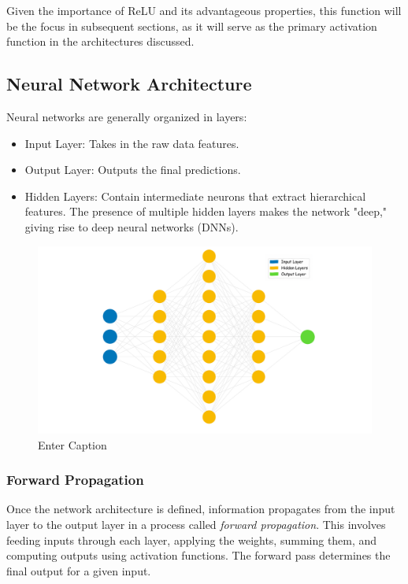 Given the importance of ReLU and its advantageous properties, this function will be the focus in subsequent sections, as it will serve as the primary activation function in the architectures discussed.

\subsection{Neural Network Architecture}
Neural networks are generally organized in layers:
\begin{itemize}
    \item Input Layer: Takes in the raw data features.
    \item Output Layer: Outputs the final predictions.
    \item Hidden Layers: Contain intermediate neurons that extract hierarchical features. The presence of multiple hidden layers makes the network "deep," giving rise to deep neural networks (DNNs).
\end{itemize}

\begin{figure}
    \centering
    \includegraphics[width=0.9\linewidth]{LateX//figs/nn_intro_def.pdf}
    \caption{Enter Caption}
    \label{fig:enter-label}
\end{figure}

\subsubsection*{Forward Propagation}
Once the network architecture is defined, information propagates from the input layer to the output layer in a process called \textit{forward propagation}. This involves feeding inputs through each layer, applying the weights, summing them, and computing outputs using activation functions. The forward pass determines the final output for a given input.

